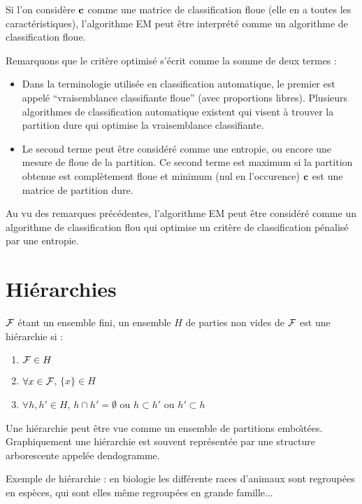 Si l'on consid\`ere $\mbox{\bf c}$ comme une matrice de classification floue (elle en
a toutes les caract\'eristiques), l'algorithme EM peut \^etre interpr\'et\'e
comme un algorithme de classification floue. 


Remarquons que le crit\`ere optimis\'e s'\'ecrit comme la somme de 
deux termes :
\begin{itemize}
\item Dans la terminologie utilis\'ee en classification automatique,
le premier est appel\'e ``vraisemblance classifiante floue'' (avec proportions
libres). Plusieurs algorithmes de 
classification automatique existent qui visent \`a trouver la partition
dure qui optimise la vraisemblance classifiante. 
\item Le second terme 
peut \^etre consid\'er\'e comme une entropie, ou encore une mesure 
de floue de la partition. Ce second terme est maximum si la partition
obtenue est compl\`etement floue et minimum (nul en l'occurence) 
$\mbox{\bf c}$ est une matrice de partition dure. 
\end{itemize}
Au vu des remarques pr\'ec\'edentes, l'algorithme EM peut \^etre consid\'er\'e
comme un algorithme de classification flou qui optimise un
crit\`ere de classification p\'enalis\'e par une entropie. 

\section{Hi\'erarchies}

\begin{defi}
${\cal F}$ \'etant un ensemble fini,
un ensemble $H$ de parties non vides de ${\cal F}$ est une hi\'erarchie si :
\begin{enumerate}
\item ${\cal F} \in H$
\item $\forall x \in {\cal F}$, $\{ x \} \in H$ 
\item $\forall h,h' \in H$,
$h \cap h'=\emptyset$ ou $h\subset h'$ ou $h'\subset h$
\end{enumerate}
\end{defi}
Une hi\'erarchie peut \^etre vue comme un ensemble de partitions 
embo\^\i t\'ees. Graphiquement une hi\'erarchie est souvent repr\'esent\'ee
par une structure arborescente appel\'ee  dendogramme. 

\begin{ex}Exemple de hi\'erarchie :
en biologie les diff\'erente races d'animaux sont regroup\'ees en esp\`eces, qui sont elles
m\^eme regroup\'ees en grande famille...  
\end{ex}


